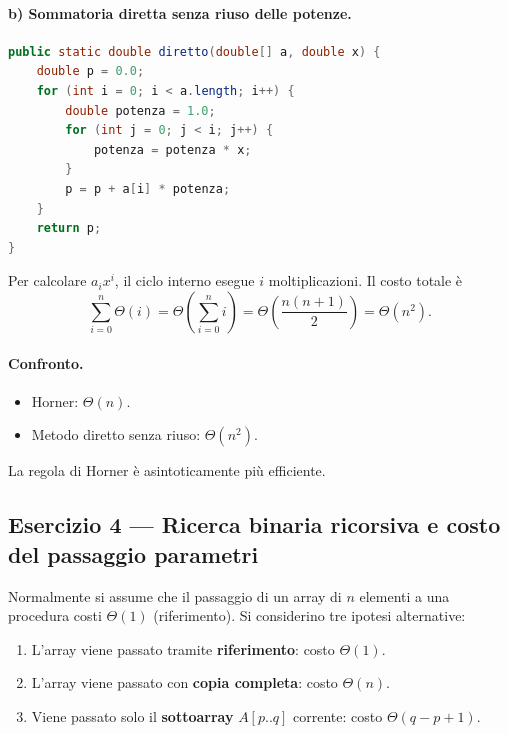 \paragraph{b) Sommatoria diretta senza riuso delle potenze.}

\begin{lstlisting}[language=Java, caption={Valutazione diretta senza riuso}]
public static double diretto(double[] a, double x) {
    double p = 0.0;
    for (int i = 0; i < a.length; i++) {
        double potenza = 1.0;
        for (int j = 0; j < i; j++) {
            potenza = potenza * x;
        }
        p = p + a[i] * potenza;
    }
    return p;
}
\end{lstlisting}

Per calcolare $a_i x^i$, il ciclo interno esegue $i$ moltiplicazioni. Il costo totale è
\[
\sum_{i=0}^{n} \Theta(i) = \Theta\!\left(\sum_{i=0}^{n} i\right) = \Theta\!\left(\frac{n(n+1)}{2}\right) = \Theta(n^2).
\]

\paragraph{Confronto.}
\begin{itemize}
	\item Horner: $\Theta(n)$.
	\item Metodo diretto senza riuso: $\Theta(n^2)$.
\end{itemize}
La regola di Horner è asintoticamente più efficiente.

\subsection{Esercizio 4 --- Ricerca binaria ricorsiva e costo del passaggio parametri}
\label{sub:es4-binsearch-params}

Normalmente si assume che il passaggio di un array di $n$ elementi a una procedura costi
$\Theta(1)$ (riferimento). Si considerino tre ipotesi alternative:

\begin{enumerate}
	\item L'array viene passato tramite \textbf{riferimento}: costo $\Theta(1)$.
	\item L'array viene passato con \textbf{copia completa}: costo $\Theta(n)$.
	\item Viene passato solo il \textbf{sottoarray} $A[p..q]$ corrente: costo $\Theta(q-p+1)$.
\end{enumerate}

